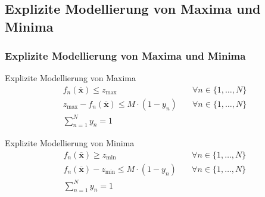 \subsection{Explizite Modellierung von Maxima und Minima}
\begin{frame}
 \frametitle{Explizite Modellierung von Maxima und Minima}
 \begin{block}{Explizite Modellierung von Maxima}
 \[
  \begin{array}{ll}
    f_n(\mathbf{\overline{x}}) \leq z_{\max} & \quad\forall n\in\{1,\ldots, N\} \\[2ex]
    z_{\max} - f_n(\mathbf{\overline{x}}) \leq M\cdot(1-y_n)&\quad\forall n\in\{1,\ldots, N\} \\[2ex]
    \sum_{n=1}^N y_n = 1& 
  \end{array}
 \]
 \end{block}
 \begin{block}{Explizite Modellierung von Minima}
 \[
  \begin{array}{ll}
    f_n(\mathbf{\overline{x}}) \geq z_{\min} & \quad\forall n\in\{1,\ldots, N\} \\[2ex]
    f_n(\mathbf{\overline{x}}) - z_{\min} \leq M\cdot(1-y_n)&\quad\forall n\in\{1,\ldots, N\} \\[2ex]
    \sum_{n=1}^N y_n = 1& 
  \end{array}
 \]
 \end{block}
\end{frame}

